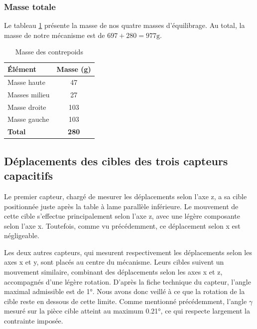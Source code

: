 \documentclass[a4paper, 11pt]{article} %
\begin{document}
\begin{minipage}[t]{0.50\textwidth}
\subsubsection*{Masse  totale}
Le tableau \ref{tab:masse_tot} présente la masse de nos quatre masses d'équilibrage. Au total, la masse de notre mécanisme est de $697 + 280 = 977\text{g}$.
\end{minipage}
\hfill
\begin{minipage}[t]{0.45\textwidth}
\vspace*{-2.5em}
\begin{table}[H]
\centering
\begin{tabular}{|l|c|}
\hline
\textbf{Élément} & \textbf{Masse (g)} \\
\hline
Masse haute & 47 \\
Masses milieu & 27 \\
Masse droite & 103 \\
Masse gauche & 103 \\
\hline
\textbf{Total} & \textbf{280} \\
\hline
\end{tabular}
\caption{Masse des contrepoids}
\label{tab:masse_tot}
\end{table}
\end{minipage}

\subsection{Déplacements des cibles des trois capteurs capacitifs}\label{sub:Deplacements_cible}
Le premier capteur, chargé de mesurer les déplacements selon l’axe z, a sa cible positionnée juste après la table à lame parallèle inférieure. Le mouvement de cette cible s’effectue principalement selon l’axe z, avec une légère composante selon l’axe x. Toutefois, comme vu précédemment, ce déplacement selon x est négligeable.

Les deux autres capteurs, qui mesurent respectivement les déplacements selon les axes x et y, sont placés au centre du mécanisme. Leurs cibles suivent un mouvement similaire, combinant des déplacements selon les axes x et z, accompagnés d’une légère rotation. D’après la fiche technique du capteur, l’angle maximal admissible est de 1°. Nous avons donc veillé à ce que la rotation de la cible reste en dessous de cette limite. Comme mentionné précédemment, l’angle $\gamma$ mesuré sur la pièce cible atteint au maximum 0.21°, ce qui respecte largement la contrainte imposée.
\end{document}
